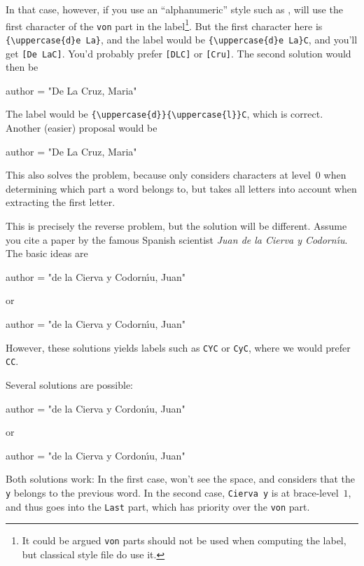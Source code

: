 In that case, however, if you use an ``alphanumeric'' style such as
, \bt will use the first character of the
\verb+von+ part in the label\footnote{It could be argued \texttt{von} parts
should not be used when computing the label, but classical style file do use
it.}. But the first character here is
\verb+{\uppercase{d}e La}+, and the label would be
\verb+{\uppercase{d}e La}C+, and you'll get \texttt{[{\uppercase{d}e La}C]}.
You'd probably prefer \texttt{[DLC]} or \texttt{[Cru]}. The second solution
would then be 
\begin{verbatimtab}
  author = "{\uppercase{d}}e {\uppercase{l}}a Cruz, Maria"
\end{verbatimtab}
The label would be \verb+{\uppercase{d}}{\uppercase{l}}C+, which is correct.  
Another (easier) proposal would be
\begin{verbatimtab}
  author = "{D}e {L}a Cruz, Maria"
\end{verbatimtab}
This also solves the problem, because \bt only considers characters at level~0 when
determining which part a word belongs to, but takes all letters into account
when extracting the first letter.



This is precisely the reverse problem, but the solution will be different. 
Assume you cite a paper by the famous Spanish scientist
\emph{Juan de la Cierva y Codorn\'\i u}. The basic ideas are
\begin{verbatimtab}
  author = "de la Cierva {\lowercase{Y}} Codorn{\'\i}u, Juan"
\end{verbatimtab}
or 
\begin{verbatimtab}
  author = "de la Cierva {y} Codorn{\'\i}u, Juan"
\end{verbatimtab}
However, these solutions yields labels such as \verb+CYC+ or \verb+CyC+, where
we would prefer \verb+CC+.

Several solutions are possible:
\begin{verbatimtab}
  author = "de la Cierva{ }y Cordon{\'\i}u, Juan"
\end{verbatimtab}
or
\begin{verbatimtab}
  author = "de la {Cierva y} Cordon{\'\i}u, Juan"
\end{verbatimtab}
Both solutions work: In the first case, \bt won't see the space, and
considers that the \verb+y+ belongs to the previous word. In the second case, 
\verb+Cierva y+ is at brace-level~$1$, and thus goes into the \verb+Last+ part,
which has priority over the \verb+von+ part.

